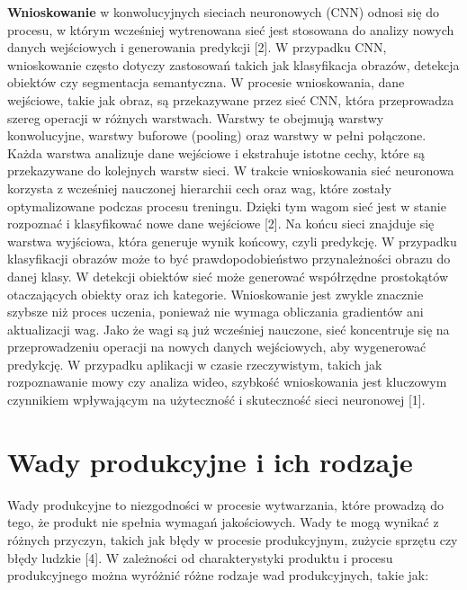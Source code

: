 \textbf{Wnioskowanie} w konwolucyjnych sieciach neuronowych (CNN) odnosi się do procesu, w którym wcześniej wytrenowana sieć jest stosowana do analizy nowych danych wejściowych i generowania predykcji [2]. W przypadku CNN, wnioskowanie często dotyczy zastosowań takich jak klasyfikacja obrazów, detekcja obiektów czy segmentacja semantyczna.
W procesie wnioskowania, dane wejściowe, takie jak obraz, są przekazywane przez sieć CNN, która przeprowadza szereg operacji w różnych warstwach. Warstwy te obejmują warstwy konwolucyjne, warstwy buforowe (pooling) oraz warstwy w pełni połączone. Każda warstwa analizuje dane wejściowe i ekstrahuje istotne cechy, które są przekazywane do kolejnych warstw sieci.
W trakcie wnioskowania sieć neuronowa korzysta z wcześniej nauczonej hierarchii cech oraz wag, które zostały optymalizowane podczas procesu treningu. Dzięki tym wagom sieć jest w stanie rozpoznać i klasyfikować nowe dane wejściowe [2].
Na końcu sieci znajduje się warstwa wyjściowa, która generuje wynik końcowy, czyli predykcję. W przypadku klasyfikacji obrazów może to być prawdopodobieństwo przynależności obrazu do danej klasy. W detekcji obiektów sieć może generować współrzędne prostokątów otaczających obiekty oraz ich kategorie.
Wnioskowanie jest zwykle znacznie szybsze niż proces uczenia, ponieważ nie wymaga obliczania gradientów ani aktualizacji wag. Jako że wagi są już wcześniej nauczone, sieć koncentruje się na przeprowadzeniu operacji na nowych danych wejściowych, aby wygenerować predykcję. W przypadku aplikacji w czasie rzeczywistym, takich jak rozpoznawanie mowy czy analiza wideo, szybkość wnioskowania jest kluczowym czynnikiem wpływającym na użyteczność i skuteczność sieci neuronowej [1].
\section{Wady produkcyjne i ich rodzaje}
Wady produkcyjne to niezgodności w procesie wytwarzania, które prowadzą do tego, że produkt nie spełnia wymagań jakościowych. Wady te mogą wynikać z różnych przyczyn, takich jak błędy w procesie produkcyjnym, zużycie sprzętu czy błędy ludzkie [4]. W zależności od charakterystyki produktu i procesu produkcyjnego można wyróżnić różne rodzaje wad produkcyjnych, takie jak:

